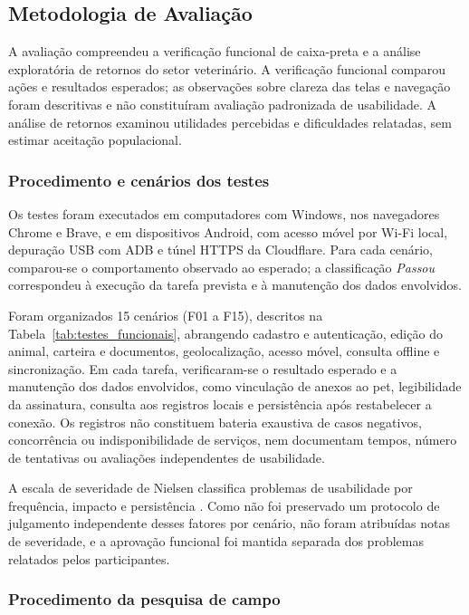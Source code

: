 \documentclass{UNESC}
\begin{document}
\FloatBarrier
\subsection{Metodologia de Avaliação}

A avaliação compreendeu a verificação funcional de caixa-preta e a análise exploratória de retornos do setor veterinário. A verificação funcional comparou ações e resultados esperados; as observações sobre clareza das telas e navegação foram descritivas e não constituíram avaliação padronizada de usabilidade. A análise de retornos examinou utilidades percebidas e dificuldades relatadas, sem estimar aceitação populacional.

\subsubsection{Procedimento e cenários dos testes}

Os testes foram executados em computadores com Windows, nos navegadores Chrome e Brave, e em dispositivos Android, com acesso móvel por Wi-Fi local, depuração USB com ADB e túnel HTTPS da Cloudflare. Para cada cenário, comparou-se o comportamento observado ao esperado; a classificação \textit{Passou} correspondeu à execução da tarefa prevista e à manutenção dos dados envolvidos.

Foram organizados 15 cenários (F01 a F15), descritos na Tabela~\ref{tab:testes_funcionais}, abrangendo cadastro e autenticação, edição do animal, carteira e documentos, geolocalização, acesso móvel, consulta offline e sincronização. Em cada tarefa, verificaram-se o resultado esperado e a manutenção dos dados envolvidos, como vinculação de anexos ao pet, legibilidade da assinatura, consulta aos registros locais e persistência após restabelecer a conexão. Os registros não constituem bateria exaustiva de casos negativos, concorrência ou indisponibilidade de serviços, nem documentam tempos, número de tentativas ou avaliações independentes de usabilidade.

A escala de severidade de Nielsen classifica problemas de usabilidade por frequência, impacto e persistência \cite{nielsen1994}. Como não foi preservado um protocolo de julgamento independente desses fatores por cenário, não foram atribuídas notas de severidade, e a aprovação funcional foi mantida separada dos problemas relatados pelos participantes.

\subsubsection{Procedimento da pesquisa de campo}
\end{document}
